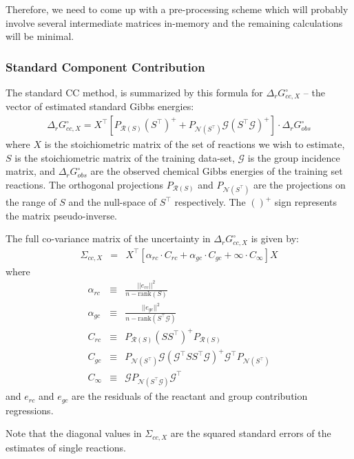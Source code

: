 \documentclass{article}
\newcommand{\Gmat}{\mathcal{G}}
\newcommand{\PRmat}[1]{P_{\mathcal{R}\left(#1\right)}}
\newcommand{\PNmat}[1]{P_{\mathcal{N}\left(#1\right)}}
\begin{document}
Therefore, we need to come up with a pre-processing scheme which will probably involve several intermediate matrices in-memory and the remaining calculations will be minimal.

\subsubsection{Standard Component Contribution}
The standard CC method, is summarized by this formula for $\Delta_{r}G_{cc,X}^{\circ}$ -- the vector of estimated standard Gibbs energies:
\begin{eqnarray}\label{eq:cc}
\Delta_{r}G_{cc,X}^{\circ} = X^{\top} 
\left[ 
	\PRmat{S} \left(S^{\top}\right)^{+} +
	\PNmat{S^\top} \Gmat \left(S^{\top}\Gmat\right)^{+}
\right]
\cdot\Delta_{r}G_{obs}^{\circ}
\end{eqnarray}
where $X$ is the stoichiometric matrix of the set of reactions we wish to estimate, $S$ is the stoichiometric matrix of the training data-set, $\Gmat$ is the group incidence matrix, and $\Delta_{r}G_{obs}^{\circ}$ are the observed chemical Gibbs energies of the training set reactions. The orthogonal projections $P_{\mathcal{R}\left(S\right)}$ and $P_{\mathcal{N}(S^{\top})}$ are the projections on the range of $S$ and the null-space of $S^\top$ respectively. The $()^{+}$ sign represents the matrix pseudo-inverse.

The full co-variance matrix of the uncertainty in $\Delta_{r}G_{cc,X}^{\circ}$ is given by:
\begin{eqnarray}
\Sigma_{cc,X} &=& X^{\top} \left[ \alpha_{rc}\cdot C_{rc} + \alpha_{gc}\cdot C_{gc} + \infty\cdot C_{\infty}  \right] X \label{eq:full_u}
\end{eqnarray}
where
\begin{eqnarray}
\alpha_{rc} &\equiv& \frac{||e_{rc}||^{2}}{n-\mbox{rank}(S)} \\
\alpha_{gc} &\equiv& \frac{||e_{gc}||^{2}}{n-\mbox{rank}(S^{\top}\Gmat)} \\
C_{rc} & \equiv & \PRmat{S} \left(SS^{\top}\right)^{+} \PRmat{S} \label{eq:c_rc}\\
C_{gc} & \equiv & \PNmat{S^\top} \Gmat \left(\Gmat^{\top}SS^{\top}\Gmat\right)^{+} \Gmat^{\top} \PNmat{S^\top} \\
C_{\infty} & \equiv & \Gmat \PNmat{S^\top\Gmat} \Gmat^{\top}
\end{eqnarray}
and $e_{rc}$ and $e_{gc}$ are the residuals of the reactant and group contribution regressions.

Note that the diagonal values in $\Sigma_{cc,X}$ are the squared standard errors of the estimates of single reactions.
\end{document}

